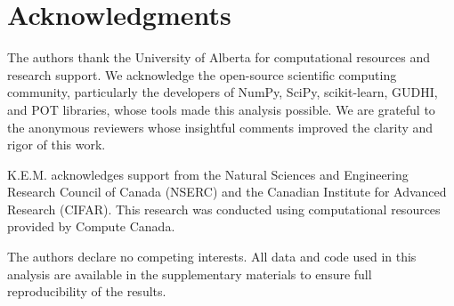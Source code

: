 \section*{Acknowledgments}

The authors thank the University of Alberta for computational resources and research support. We acknowledge the open-source scientific computing community, particularly the developers of NumPy, SciPy, scikit-learn, GUDHI, and POT libraries, whose tools made this analysis possible. We are grateful to the anonymous reviewers whose insightful comments improved the clarity and rigor of this work.

K.E.M. acknowledges support from the Natural Sciences and Engineering Research Council of Canada (NSERC) and the Canadian Institute for Advanced Research (CIFAR). This research was conducted using computational resources provided by Compute Canada.

The authors declare no competing interests. All data and code used in this analysis are available in the supplementary materials to ensure full reproducibility of the results. 